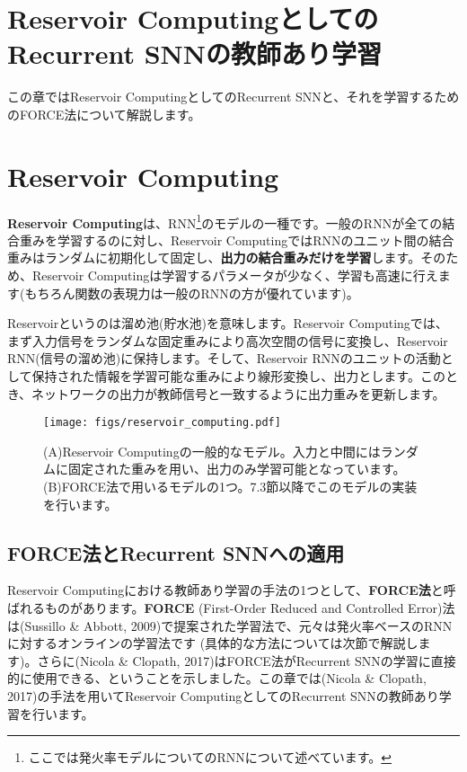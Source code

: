 \section{Reservoir ComputingとしてのRecurrent SNNの教師あり学習}
この章ではReservoir ComputingとしてのRecurrent SNNと、それを学習するためのFORCE法について解説します。
\section{Reservoir Computing}
\textbf{Reservoir Computing}は、RNN\footnote{ここでは発火率モデルについてのRNNについて述べています。}のモデルの一種です。一般のRNNが全ての結合重みを学習するのに対し、Reservoir ComputingではRNNのユニット間の結合重みはランダムに初期化して固定し、\textbf{出力の結合重みだけを学習}します。そのため、Reservoir Computingは学習するパラメータが少なく、学習も高速に行えます(もちろん関数の表現力は一般のRNNの方が優れています)。\par
Reservoirというのは溜め池(貯水池)を意味します。Reservoir Computingでは、まず入力信号をランダムな固定重みにより高次空間の信号に変換し、Reservoir RNN(信号の溜め池)に保持します。そして、Reservoir RNNのユニットの活動として保持された情報を学習可能な重みにより線形変換し、出力とします。このとき、ネットワークの出力が教師信号と一致するように出力重みを更新します。

\begin{figure}[htbp]
    \centering
    \texttt{[image: figs/reservoir\_computing.pdf]}
    \caption{(A)Reservoir Computingの一般的なモデル。入力と中間にはランダムに固定された重みを用い、出力のみ学習可能となっています。 (B)FORCE法で用いるモデルの1つ。7.3節以降でこのモデルの実装を行います。}
    \label{fig:RC}
\end{figure}
\subsection{FORCE法とRecurrent SNNへの適用}
Reservoir Computingにおける教師あり学習の手法の1つとして、\textbf{FORCE法}と呼ばれるものがあります。\textbf{FORCE} (First-Order Reduced and Controlled Error)法は(Sussillo \& Abbott, 2009)で提案された学習法で、元々は発火率ベースのRNNに対するオンラインの学習法です (具体的な方法については次節で解説します)。さらに(Nicola \& Clopath, 2017)はFORCE法がRecurrent SNNの学習に直接的に使用できる、ということを示しました。この章では(Nicola \& Clopath, 2017)の手法を用いてReservoir ComputingとしてのRecurrent SNNの教師あり学習を行います。

